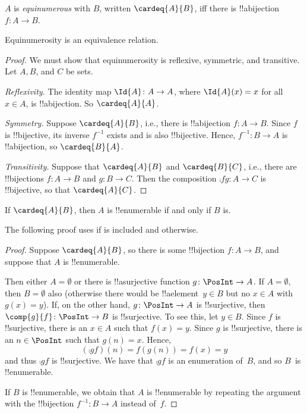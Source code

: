 \begin{defn}
  $A$ is \emph{equinumerous} with $B$, written $\cardeq{A}{B}$, iff
  there is !!a{bijection} $f \colon A \to B$. 
\end{defn}

\begin{prop}
Equinumerosity is an equivalence relation.
\end{prop}

\begin{proof} 
We must show that equinumerosity is reflexive, symmetric, and
transitive. Let $A, B$, and $C$ be sets.

\emph{Reflexivity.} The identity map $\Id{A} \colon A \to A$, where
$\Id{A} (x) = x$ for all $x \in A$, is !!a{bijection}. So
$\cardeq{A}{A}$.

\emph{Symmetry.} Suppose $\cardeq{A}{B}$, i.e., there is
!!a{bijection} $f\colon A \to B$. Since $f$ is !!{bijective}, its
inverse $f^{-1}$ exists and is also !!{bijective}. Hence,
$f^{-1}\colon B \to A$ is !!a{bijection}, so $\cardeq{B}{A}$.

\emph{Transitivity.} Suppose that $\cardeq{A}{B}$ and $\cardeq{B}{C}$,
i.e., there are !!{bijection}s $f\colon A \to B$ and $g\colon B \to
C$. Then the composition $\comp{f}{g}\colon A \to C$ is !!{bijective},
so that $\cardeq{A}{C}$.
\end{proof}

\begin{prop}
If $\cardeq{A}{B}$, then $A$ is !!{enumerable} if
and only if $B$ is.
\end{prop}

\begin{editorial}
The following proof uses  if
 is included and 
otherwise.
\end{editorial}

\begin{proof}
Suppose $\cardeq{A}{B}$, so there is some !!{bijection} $f \colon A
\to B$, and suppose that $A$ is !!{enumerable}.

  Then either $A = \emptyset$ or there is !!a{surjective} function
  $g\colon \PosInt \to A$. If $A = \emptyset$, then $B = \emptyset$
  also (otherwise there would be !!a{element}~$y \in B$ but no $x \in
  A$ with $g(x) = y$). If, on the other hand, $g\colon \PosInt \to A$
  is !!{surjective}, then $\comp{g}{f} \colon \PosInt \to B$ is
  !!{surjective}. To see this, let $y \in B$. Since $f$ is
  !!{surjective}, there is an $x \in A$ such that $f(x) = y$. Since
  $g$ is !!{surjective}, there is an $n \in \PosInt$ such that $g(n) =
  x$. Hence,
\[
(\comp{g}{f})(n) = f(g(n)) = f(x) = y
\]
and thus $\comp{g}{f}$ is !!{surjective}. We have that $\comp{g}{f}$
is an enumeration of~$B$, and so $B$~is !!{enumerable}.

If $B$ is !!{enumerable}, we obtain that $A$ is !!{enumerable} by
repeating the argument with the !!{bijection} $f^{-1}\colon B \to A$
instead of~$f$. 
\end{proof}

